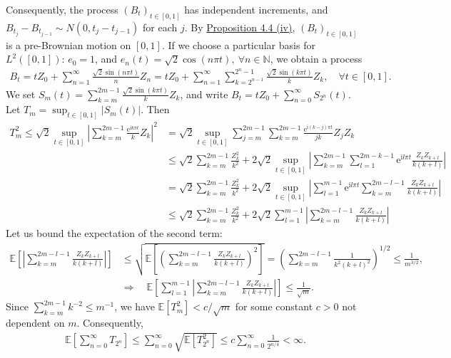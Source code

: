 \documentclass{article}
\numberwithin{equation}{section}
\newcommand{\e}{\mathrm{e}}
\newcommand{\E}{\mathbb{E}}
\renewcommand{\i}{\mathrm{i}}
\theoremstyle{plain}
\theoremstyle{definition}
\begin{document}
Consequently, the process $(B_t)_{t\in[0,1]}$ has independent increments, and $B_{t_j}-B_{t_{j-1}}\sim N(0,t_j-t_{j-1})$ for each $j$. By \hyperref[prop:4.4]{Proposition 4.4 (iv)}, $(B_t)_{t\in[0,1]}$ is a pre-Brownian motion on $[0,1]$. If we choose a particular basis for $L^2([0,1])$: $e_0=1$, and $e_n(t)=\sqrt{2}\cos(n\pi t),\ \forall n\in\mathbb{N}$, we obtain a process
\begin{align*}
	B_t = tZ_0 + \sum_{n=1}^\infty\frac{\sqrt{2}\sin(n\pi t)}{n}Z_n=tZ_0+\sum_{n=1}^\infty\sum_{k=2^{n-1}}^{2^n - 1}\frac{\sqrt{2}\sin(k\pi t)}{k}Z_k,\quad \forall t\in[0,1].
\end{align*}
We set $S_m(t)=\sum_{k=m}^{2m-1}\frac{\sqrt{2}\sin(k\pi t)}{k}Z_k$, and write $B_t=tZ_0+\sum_{n=0}^\infty S_{2^n}(t)$. Let $T_m=\sup_{t\in[0,1]}\vert S_m(t)\vert$. Then
\begin{align*}
	T_m^2\leq \sqrt{2}\sup_{t\in[0,1]}\left\vert\sum_{k=m}^{2m-1}\frac{\e^{\i k\pi t}}{k} Z_k\right\vert^2 &= \sqrt{2}\sup_{t\in[0,1]}\sum_{j=m}^{2m-1}\sum_{k=m}^{2m-1}\frac{\e^{\i(k-j)\pi t}}{jk} Z_jZ_k\\
	&\leq \sqrt{2}\sum_{k=m}^{2m-1}\frac{Z_k^2}{k^2} + 2\sqrt{2}\sup_{t\in[0,1]}\left\vert\sum_{k=m}^{2m-1}\sum_{l=1}^{2m-k-1}\e^{\i l\pi t}\frac{Z_k Z_{k+l}}{k(k+l)}\right\vert\\
	&= \sqrt{2}\sum_{k=m}^{2m-1}\frac{Z_k^2}{k^2} + 2\sqrt{2}\sup_{t\in[0,1]}\left\vert\sum_{l=1}^{m-1}\e^{\i l\pi t}\sum_{k=m}^{2m-l-1}\frac{Z_k Z_{k+l}}{k(k+l)}\right\vert\\
	&\leq \sqrt{2}\sum_{k=m}^{2m-1}\frac{Z_k^2}{k^2} + 2\sqrt{2}\sum_{l=1}^{m-1}\left\vert\sum_{k=m}^{2m-l-1}\frac{Z_k Z_{k+l}}{k(k+l)}\right\vert
\end{align*}
Let us bound the expectation of the second term:
\begin{align*}
	\E\left[\left\vert\sum_{k=m}^{2m-l-1}\frac{Z_k Z_{k+l}}{k(k+l)}\right\vert\right]&\leq\sqrt{\E\left[\left(\sum_{k=m}^{2m-l-1}\frac{Z_k Z_{k+l}}{k(k+l)}\right)^2\right]}=\left(\sum_{k=m}^{2m-l-1}\frac{1}{k^2(k+l)^2}\right)^{1/2}\leq\frac{1}{m^{3/2}},\\
	&\Rightarrow\quad \E\left[\sum_{l=1}^{m-1}\left\vert\sum_{k=m}^{2m-l-1}\frac{Z_k Z_{k+l}}{k(k+l)}\right\vert\right]\leq\frac{1}{\sqrt{m}}.
\end{align*}
Since $\sum_{k=m}^{2m-1}k^{-2}\leq m^{-1}$, we have $\E[T_m^2]<c/\sqrt{m}$ for some constant $c>0$ not dependent on $m$. Consequently,
\begin{align*}
	\E\left[\sum_{n=0}^\infty T_{2^n}\right]\leq\sum_{n=0}^\infty\sqrt{\E[T_{2^n}^2]}\leq c\sum_{n=0}^\infty\frac{1}{2^{n/4}}<\infty.
\end{align*}
\end{document}
